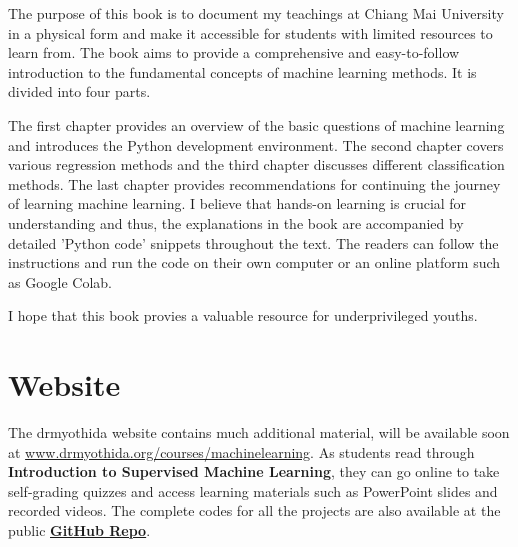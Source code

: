 The purpose of this book is to document my teachings at Chiang Mai University in a physical form and make it accessible for students with limited resources to learn from. The book aims to provide a comprehensive and easy-to-follow introduction to the fundamental concepts of machine learning methods. It is divided into four parts.

The first chapter provides an overview of the basic questions of machine learning and introduces the Python development environment. The second chapter covers various regression methods and the third chapter discusses different classification methods. The last chapter provides recommendations for continuing the journey of learning machine learning. I believe that hands-on learning is crucial for understanding and thus, the explanations in the book are accompanied by detailed 'Python code' snippets throughout the text. The readers can follow the instructions and run the code on their own computer or an online platform such as Google Colab.

I hope that this book provies a valuable resource for underprivileged youths.

\chapter*{Website}

The drmyothida website contains much additional material, will be available soon at \href{www.drmyothida.org/courses}{www.drmyothida.org/courses/machinelearning}. As students read through \textbf{Introduction to Supervised Machine Learning}, they can go online to take self-grading quizzes and access learning materials such as PowerPoint slides and recorded videos. The complete codes for all the projects are also available at the public
\href{https://github.com/myothida/Intro-To-Supervised-Machine-Learning.git}{\textbf{GitHub Repo}}.
